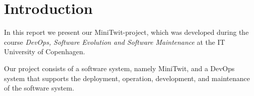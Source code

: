 \section*{Introduction}

In this report we present our MiniTwit-project, which was developed during the course \textit{DevOps, Software Evolution and Software Maintenance} at the IT University of Copenhagen.

Our project consists of a software system, namely MiniTwit, and a DevOps system that supports the deployment, operation, development, and maintenance of the software system.

